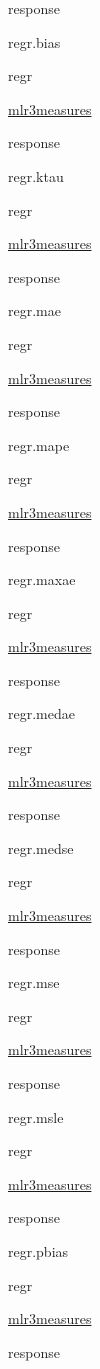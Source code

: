 \documentclass[]{article}
\begin{document}
response

regr.bias

regr

\href{https://cran.r-project.org/package=mlr3measures}{mlr3measures}

response

regr.ktau

regr

\href{https://cran.r-project.org/package=mlr3measures}{mlr3measures}

response

regr.mae

regr

\href{https://cran.r-project.org/package=mlr3measures}{mlr3measures}

response

regr.mape

regr

\href{https://cran.r-project.org/package=mlr3measures}{mlr3measures}

response

regr.maxae

regr

\href{https://cran.r-project.org/package=mlr3measures}{mlr3measures}

response

regr.medae

regr

\href{https://cran.r-project.org/package=mlr3measures}{mlr3measures}

response

regr.medse

regr

\href{https://cran.r-project.org/package=mlr3measures}{mlr3measures}

response

regr.mse

regr

\href{https://cran.r-project.org/package=mlr3measures}{mlr3measures}

response

regr.msle

regr

\href{https://cran.r-project.org/package=mlr3measures}{mlr3measures}

response

regr.pbias

regr

\href{https://cran.r-project.org/package=mlr3measures}{mlr3measures}

response
\end{document}
